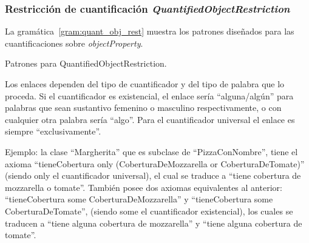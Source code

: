 \subsubsection{Restricción de cuantificación \emph{QuantifiedObjectRestriction}}
La gramática~\ref{gram:quant_obj_rest} muestra los patrones diseñados para las cuantificaciones sobre \emph{objectProperty}.

\begin{GrammarEnv}
\begin{grammar}
\end{grammar}
\caption{Patrones para QuantifiedObjectRestriction.}\label{gram:quant_obj_rest}
\end{GrammarEnv}

Los enlaces dependen del tipo de cuantificador y del tipo de palabra que lo proceda. Si el cuantificador es existencial, el enlace sería ``alguna/algún'' para palabras que sean sustantivo femenino o masculino respectivamente, o con cualquier otra palabra sería ``algo''.  Para el cuantificador universal el enlace es siempre ``exclusivamente''.

Ejemplo: la clase ``Margherita'' que es subclase de ``PizzaConNombre'', tiene el axioma ``tieneCobertura only 
    (CoberturaDeMozzarella or CoberturaDeTomate)'' (siendo only el cuantificador universal), el cual se traduce a ``tiene cobertura de mozzarella o tomate''. También posee dos axiomas equivalentes al anterior: ``tieneCobertura some CoberturaDeMozzarella'' y ``tieneCobertura some CoberturaDeTomate'', (siendo some el cuantificador existencial), los cuales se traducen a ``tiene alguna cobertura de mozzarella'' y ``tiene alguna cobertura de tomate''.


